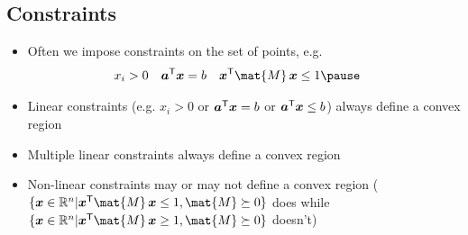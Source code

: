 
\begin{slide}
\section{Constraints}

\begin{PauseHighLight}
  \begin{itemize}
  \item Often we impose constraints on the set of points, e.g.
    \begin{align*}
      x_i &> 0  & \bm{a}^\tr \bm{x} &= b & \bm{x}^\tr \mat{M}
                                           \, \bm{x} &\leq 1\pause
    \end{align*}
  \item Linear constraints (e.g. $x_i > 0$ or $\bm{a}^{\textsf{T}} \bm{x} =
    b$ or $\bm{a}^{\textsf{T}} \bm{x} \leq b$) always define a
    convex region\pause
  \item Multiple linear constraints always define a convex region\pause
  \item Non-linear constraints may or may not define a convex
    region\pause{} ($\{\bm{x} \in \mathbb{R}^n|\bm{x}^\tr \mat{M}\, \bm{x}
    \leq 1, \mat{M}\succeq 0\}$ does while
     $\{\bm{x} \in \mathbb{R}^n|\bm{x}^\tr \mat{M}\, \bm{x}
    \geq 1, \mat{M}\succeq 0\}$ doesn't)\pauseb
  \end{itemize}
\end{PauseHighLight}
  

\end{slide}




